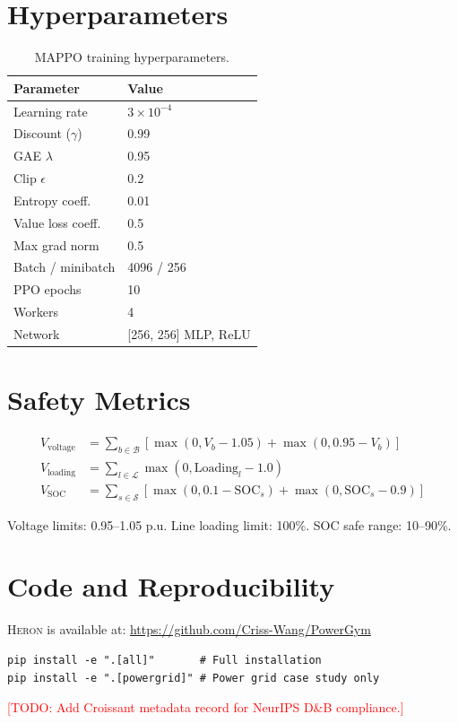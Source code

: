 \documentclass{article}
\newcommand{\heron}{\textsc{Heron}}
\newcommand{\todo}[1]{\textcolor{red}{[TODO: #1]}}
\begin{document}
\section{Hyperparameters}
\label{app:hyperparams}

\begin{table}[h]
\centering
\caption{MAPPO training hyperparameters.}
\small
\begin{tabular}{@{}ll@{}}
\toprule
\textbf{Parameter} & \textbf{Value} \\
\midrule
Learning rate & $3 \times 10^{-4}$ \\
Discount ($\gamma$) & 0.99 \\
GAE $\lambda$ & 0.95 \\
Clip $\epsilon$ & 0.2 \\
Entropy coeff. & 0.01 \\
Value loss coeff. & 0.5 \\
Max grad norm & 0.5 \\
Batch / minibatch & 4096 / 256 \\
PPO epochs & 10 \\
Workers & 4 \\
Network & [256, 256] MLP, ReLU \\
\bottomrule
\end{tabular}
\end{table}

\section{Safety Metrics}
\label{app:safety}

\begin{align}
V_{\text{voltage}} &= \sum_{b \in \mathcal{B}} \left[\max(0, V_b - 1.05) + \max(0, 0.95 - V_b)\right] \\
V_{\text{loading}} &= \sum_{l \in \mathcal{L}} \max(0, \text{Loading}_l - 1.0) \\
V_{\text{SOC}} &= \sum_{s \in \mathcal{S}} \left[\max(0, 0.1 - \text{SOC}_s) + \max(0, \text{SOC}_s - 0.9)\right]
\end{align}

Voltage limits: 0.95--1.05 p.u. Line loading limit: 100\%. SOC safe range: 10--90\%.

\section{Code and Reproducibility}
\label{app:code}

\heron{} is available at: \url{https://github.com/Criss-Wang/PowerGym}

\begin{verbatim}
pip install -e ".[all]"       # Full installation
pip install -e ".[powergrid]" # Power grid case study only
\end{verbatim}

\todo{Add Croissant metadata record for NeurIPS D\&B compliance.}
\end{document}
